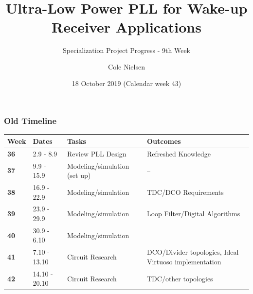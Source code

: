 \documentclass[t, screen, aspectratio=43]{beamer}
\title[Short title]{Ultra-Low Power PLL for Wake-up Receiver Applications}
\subtitle{Specialization Project Progress - 9th Week}
\author[C Nielsen]{Cole Nielsen}
\institute[NTNU]{Department of Electronic Systems, NTNU}
\date{18 October 2019 (Calendar week 43)}
\begin{document}
\begin{frame}
	\titlepage%
\end{frame}


\begin{frame}
	\frametitle{\color{red} Old Timeline}
	\begin{table}[htb!]
		\tiny
		\centering
		\vspace{-1em}
		\def\arraystretch{1.5}		
		\setlength\arrayrulewidth{0.75pt}
		\setlength{\tabcolsep}{1em} %
		\begin{tabular}{|l|l|l|l|}
			\hline 
			\rule[-1ex]{0pt}{2.5ex} \cellcolor{gray!40}\textbf{Week} & \cellcolor{gray!40}\textbf{Dates} &\cellcolor{gray!40}\textbf{Tasks} & \cellcolor{gray!40}\textbf{Outcomes}\\ 
			\hline 
			\rule[-1ex]{0pt}{2.5ex} \cellcolor{red!20}\textbf{36}& \cellcolor{red!20}2.9 - 8.9 & \cellcolor{red!20}Review PLL Design & \cellcolor{red!20}Refreshed Knowledge\\ 
			\hline 
			\rule[-1ex]{0pt}{2.5ex} \cellcolor{red!20}\textbf{37}& \cellcolor{red!20}9.9 - 15.9 & \cellcolor{red!20}Modeling/simulation (set up) & \cellcolor{red!20}--\\ 
			\hline 
			\rule[-1ex]{0pt}{2.5ex} \cellcolor{red!20}\textbf{38}& \cellcolor{red!20}16.9 - 22.9 & \cellcolor{red!20}Modeling/simulation &\cellcolor{red!20}TDC/DCO Requirements\\ 
			\hline 
			\rule[-1ex]{0pt}{2.5ex} \cellcolor{red!20}\textbf{39}& \cellcolor{red!20}23.9 - 29.9& \cellcolor{red!20}Modeling/simulation& \cellcolor{red!20}Loop Filter/Digital Algorithms\\ 
			\hline 
			\rule[-1ex]{0pt}{2.5ex} \cellcolor{red!20}\textbf{40}& \cellcolor{red!20}30.9 - 6.10& \cellcolor{red!20}Modeling/simulation& \cellcolor{red!20}{Loop filter, DCO, TDC, calibration}\color{black}\\ 
			\hline 
			\rule[-1ex]{0pt}{2.5ex} \cellcolor{red!20}\textbf{41}&\cellcolor{red!20}7.10 - 13.10&\cellcolor{red!20}Circuit Research &\cellcolor{red!20}DCO/Divider topologies, Ideal Virtuoso implementation\\ 
			\hline 
			\rule[-1ex]{0pt}{2.5ex} \cellcolor{red!20}\textbf{42}&\cellcolor{red!20}14.10 - 20.10&\cellcolor{red!20}Circuit Research &\cellcolor{red!20}TDC/other topologies\\ 

\end{tabular}
\end{table}
\end{frame}
\end{document}
